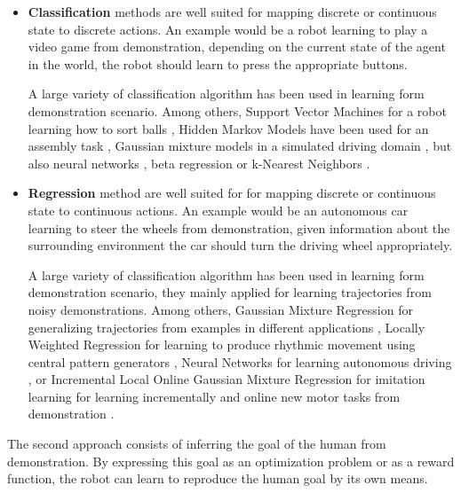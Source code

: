 \begin{itemize}

\item \textbf{Classification} methods are well suited for mapping discrete or continuous state to discrete actions. An example would be a robot learning to play a video game from demonstration, depending on the current state of the agent in the world, the robot should learn to press the appropriate buttons.

A large variety of classification algorithm has been used in learning form demonstration scenario. Among others, Support Vector Machines for a robot learning how to sort balls \cite{chernova2008teaching}, Hidden Markov Models have been used for an assembly task \cite{hovland1996skill}, Gaussian mixture models in a simulated driving domain \cite{chernova09jair}, but also neural networks \cite{mataric2000sensory}, beta regression \cite{montesano2009learning} or k-Nearest Neighbors \cite{saunders2006teaching}.

\item \textbf{Regression} method are well suited for for mapping discrete or continuous state to continuous actions. An example would be an autonomous car learning to steer the wheels from demonstration, given information about the surrounding environment the car should turn the driving wheel appropriately.

A large variety of classification algorithm has been used in learning form demonstration scenario, they mainly applied for learning trajectories from noisy demonstrations. Among others, Gaussian Mixture Regression for generalizing trajectories from examples in different applications \cite{calinon07}, Locally Weighted Regression for learning to produce rhythmic movement using central pattern generators \cite{schaal1998programmable,ijspeert2002learning}, Neural Networks for learning autonomous driving \cite{pomerleau1991efficient}, or Incremental Local Online Gaussian Mixture Regression for imitation learning for learning incrementally
and online new motor tasks from demonstration \cite{cederborg2010incremental}.

\end{itemize}

The second approach consists of inferring the goal of the human from demonstration. By expressing this goal as an optimization problem or as a reward function, the robot can learn to reproduce the human goal by its own means.

